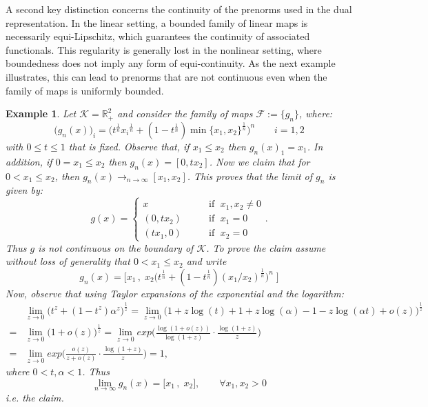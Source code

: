 \documentclass{article}
\newtheorem{example}[theorem]{Example}
\newcommand{\R}{\mathbb{R}}
\newcommand{\family}{\mathcal{F}}
\newcommand{\cone}{\mathcal{K}}
\begin{document}
A second key distinction concerns the continuity of the prenorms used in the dual representation. In the linear setting, a bounded family of linear maps is necessarily equi-Lipschitz, which guarantees the continuity of associated functionals. This regularity is generally lost in the nonlinear setting, where boundedness does not imply any form of equi-continuity. As the next example illustrates, this can lead to prenorms that are not continuous even when the family of maps is uniformly bounded.
%
\begin{example}\label{Example_uniform_convergence}
    Let $\cone=\R^2_+$ and consider the family of maps $\family:=\{g_n\}$, where:    $$\big(g_n(x)\big)_{i}=\big(t^{\frac{1}{n}}{x_{i}}^{\frac{1}{n}}+(1-t^{\frac{1}{n}})\min\{x_1,x_2\}^{\frac{1}{n}}\big)^n \qquad i=1,2$$
    with $0\leq t\leq1$ that is fixed.
    Observe that, if $x_1\leq x_2$ then $g_n(x)_1=x_1$. In addition, if $0=x_1 \leq x_2$ then $g_n(x)=[0,t x_2]$. Now we claim that for $0<x_1\leq x_2$, then $g_n(x)\rightarrow_{n\rightarrow\infty} [x_1,x_2]$. This proves that the limit of $g_n$ is given by:
    \begin{equation}
    g(x)=\begin{cases}
    x & \qquad \text{if }\; x_1,x_2\neq 0\\
    (0,tx_2) & \qquad \text{if }\; x_1=0\\
    (tx_1,0) & \qquad \text{if }\; x_2=0
    \end{cases}.
    \end{equation}
    Thus $g$ is not continuous on the boundary of $\cone$.
    To prove the claim assume without loss of generality that $0< x_1\leq x_2$ and write
    \begin{equation}
    g_n(x)=\Big[x_1\,,\; x_2\Big(t^{\frac{1}{n}}+(1-t^{\frac{1}{n}})(x_1/x_2)^{\frac{1}{n}}\Big)^n \;\Big]
    \end{equation}
    Now, observe that using Taylor expansions of the exponential and the logarithm:
    \begin{equation}
    \begin{aligned}        
    &\lim_{z\rightarrow 0}\Big(t^z+(1-t^z)\alpha^z \Big)^{\frac{1}{z}}=\lim_{z\rightarrow 0} \Big(1+z\log(t)+1+z\log(\alpha)-1-z\log(\alpha t)+o(z)\Big)^{\frac{1}{z}}\\
     =&\lim_{z\rightarrow 0}\Big(1+ o(z)\Big)^\frac{1}{z}=\lim_{z\rightarrow 0} exp\bigg(\frac{\log(1+ o(z))}{\log(1+z)} \cdot \frac{\log(1+z)}{z}\bigg)\\
     =&\lim_{z\rightarrow 0} exp\bigg(\frac{o(z)}{z+o(z)} \cdot \frac{\log(1+z)}{z}\bigg)=1,
     \end{aligned}
     \end{equation}
     where $0<t,\alpha<1$.
     Thus
    \begin{equation}
     \lim_{n\rightarrow \infty}g_n(x)=\Big[x_1\,,\; x_2 \Big], \qquad \forall x_1,x_2>0
    \end{equation}
    i.e. the claim.
\end{example}
\end{document}
